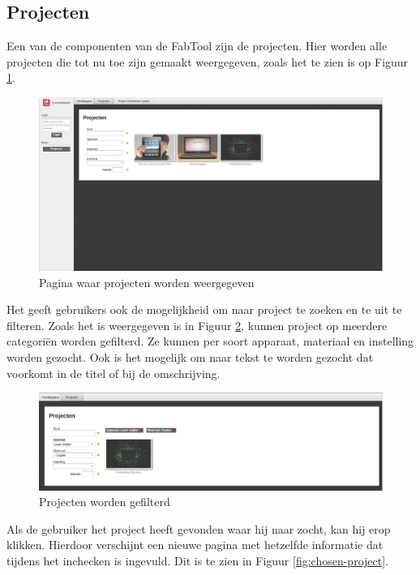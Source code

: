 \subsection{Projecten}

Een van de componenten van de FabTool zijn de projecten. Hier worden alle projecten die tot nu toe zijn gemaakt weergegeven, zoals het te zien is op Figuur \ref{fig:projects}.

\begin{figure}[Hh]
	\centering
	\includegraphics[width=1\textwidth]{Images/projects.png}
	\caption{Pagina waar projecten worden weergegeven}
	\label{fig:projects}
\end{figure}

Het geeft gebruikers ook de mogelijkheid om naar project te zoeken en te uit te filteren. Zoals het is weergegeven is in Figuur \ref{fig:filter-projects}, kunnen project op meerdere categori\"en worden gefilterd. Ze kunnen per soort apparaat, materiaal en instelling worden gezocht. Ook is het mogelijk om naar tekst te worden gezocht dat voorkomt in de titel of bij de omschrijving.

\begin{figure}[Hh]
	\centering
	\includegraphics[width=1\textwidth]{Images/filter-projects.png}
	\caption{Projecten worden gefilterd}
	\label{fig:filter-projects}
\end{figure}

Als de gebruiker het project heeft gevonden waar hij naar zocht, kan hij erop klikken. Hierdoor verschijnt een nieuwe pagina met hetzelfde informatie dat tijdens het inchecken is ingevuld. Dit is te zien in Figuur \ref{fig:chosen-project}.

